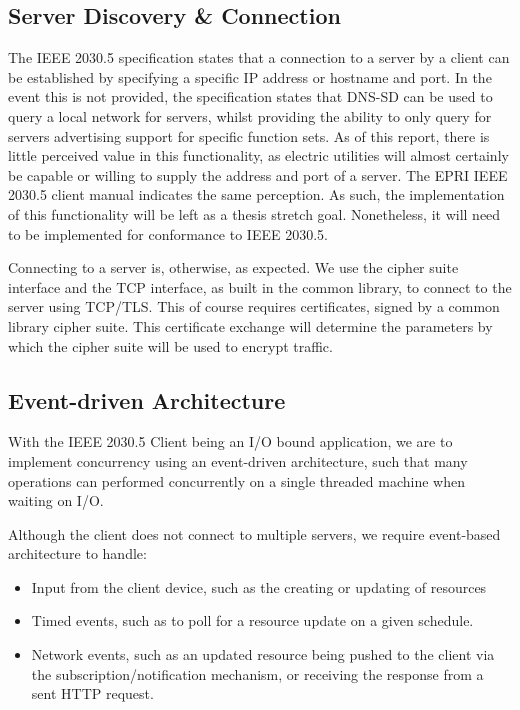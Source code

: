 \subsection{Server Discovery \& Connection}
The IEEE 2030.5 specification states that a connection to a server by a client can be established by specifying a specific IP address or hostname and port.
In the event this is not provided, the specification states that DNS-SD can be used to query a local network for servers, whilst providing the ability to only query for servers advertising support for specific function sets.
As of this report, there is little perceived value in this functionality, as electric utilities will almost certainly be capable or willing to supply the address and port of a server.
The EPRI IEEE 2030.5 client manual indicates the same perception.\cite[]{eprimanual}
As such, the implementation of this functionality will be left as a thesis stretch goal. Nonetheless, it will need to be implemented for conformance to IEEE 2030.5.

Connecting to a server is, otherwise, as expected. We use the cipher suite interface and the TCP interface, as built in the common library, to connect to the server using TCP/TLS.
This of course requires certificates, signed by a common library cipher suite. This certificate exchange will determine the parameters by which the cipher suite will be used to encrypt traffic.

\subsection{Event-driven Architecture}
With the IEEE 2030.5 Client being an I/O bound application, we are to implement concurrency using an event-driven architecture, such that many operations can performed concurrently on a single threaded machine when waiting on I/O.

Although the client does not connect to multiple servers, we require event-based architecture to handle:
\begin{itemize}
    \item Input from the client device, such as the creating or updating of resources
    \item Timed events, such as to poll for a resource update on a given schedule.
    \item Network events, such as an updated resource being pushed to the client via the subscription/notification mechanism, or receiving the response from a sent HTTP request.
\end{itemize}

